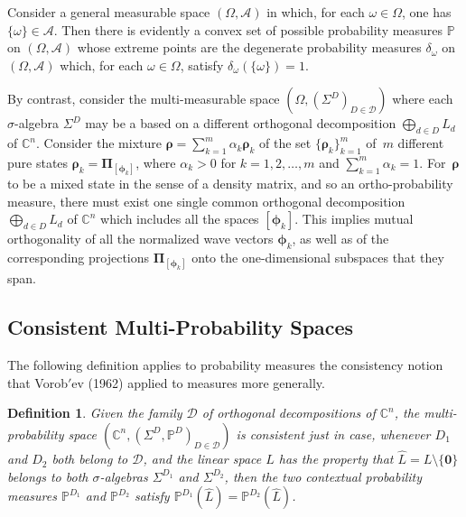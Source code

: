 \documentclass[11pt]{article}
\newcommand \C { \mathbb{C} }
\newtheorem{definition}[theorem]{Definition}
\begin{document}
Consider a general measurable space $( \Omega, \mathcal A)$ in which, 
for each $ \omega \in \Omega $, one has $ \{ \omega \} \in \mathcal A$.  
Then there is evidently a convex set 
of possible probability measures $ \mathbb P$ on $( \Omega, \mathcal A)$ 
whose extreme points are the degenerate probability measures $ \delta _\omega $ 
on $( \Omega, \mathcal A)$ which, for each $ \omega \in \Omega $, 
satisfy $ \delta _\omega ( \{ \omega \} ) = 1$.

By contrast, consider the multi-measurable space $( \Omega, ( \Sigma ^D )_{D \in \mathcal D}) $ where each $ \sigma $-algebra $ \Sigma ^D $ may be a based on a different 
orthogonal decomposition $ \bigoplus _{d \in D} L_d $ of $ \C^n $.
Consider the mixture \( \boldsymbol \rho = \sum _{k = 1}^m \alpha _k \boldsymbol \rho _k \)
of the set $ \{ \boldsymbol \rho _k \} _{k = 1}^m $ of~$m$ different 
pure states $ \boldsymbol \rho _k = \boldsymbol \Pi _{[ \boldsymbol \phi _k ]} $, 
where $ \alpha _k > 0$ for $k = 1, 2, \ldots, m$ and $ \sum _{k = 1}^m \alpha _k = 1$. 
For~$ \boldsymbol \rho $ to be a mixed state in the sense of a density matrix, 
and so an ortho-probability measure,
there must exist one single common orthogonal decomposition $ \bigoplus _{d \in D} L_d $ 
of $ \C^n $ which includes all the spaces $[ \boldsymbol \phi _k ]$.
This implies mutual orthogonality of all the normalized wave vectors $ \boldsymbol \phi _k $, 
as well as of the corresponding projections $ \boldsymbol \Pi _{[ \boldsymbol \phi _k ]}$
onto the one-dimensional subspaces that they span.

\subsection{Consistent Multi-Probability Spaces}

The following definition applies to probability measures
the consistency notion that Vorob$'$ev (1962) applied to measures more generally.

\begin{definition} \label{def:vorob}
	Given the family $ \mathcal D$ of orthogonal decompositions of $ \C^n $,
	the multi-probability space \( ( \C^n, ( \Sigma ^D, \mathbb P^D )_{D \in \mathcal D}) \)
	is \emph{consistent}
	just in case, whenever $ D_1 $ and $ D_2 $ both belong to $ \mathcal D$,
	and the linear space $L$ has the property that $\hat L = L \setminus \{ \mathbf 0\} $ 
	belongs to both $ \sigma $-algebras $ \Sigma ^{ D_1 }$ and $ \Sigma ^{ D_2 }$,
	then the two contextual probability measures $\mathbb P^{ D_1 }$ and $ \mathbb P^{ D_2 }$
	satisfy \( \mathbb P^{ D_1 } ( \hat L) = \mathbb P^{ D_2 } ( \hat L) \).
\end{definition}
\end{document}
